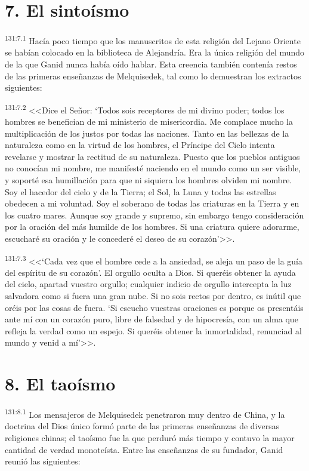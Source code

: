 \section*{7. El sintoísmo}
\par 
\textsuperscript{131:7.1} Hacía poco tiempo que los manuscritos de esta religión del Lejano Oriente se habían colocado en la biblioteca de Alejandría. Era la única religión del mundo de la que Ganid nunca había oído hablar. Esta creencia también contenía restos de las primeras enseñanzas de Melquisedek, tal como lo demuestran los extractos siguientes:

\par 
\textsuperscript{131:7.2} <<Dice el Señor: `Todos sois receptores de mi divino poder; todos los hombres se benefician de mi ministerio de misericordia. Me complace mucho la multiplicación de los justos por todas las naciones. Tanto en las bellezas de la naturaleza como en la virtud de los hombres, el Príncipe del Cielo intenta revelarse y mostrar la rectitud de su naturaleza. Puesto que los pueblos antiguos no conocían mi nombre, me manifesté naciendo en el mundo como un ser visible, y soporté esa humillación para que ni siquiera los hombres olviden mi nombre. Soy el hacedor del cielo y de la Tierra; el Sol, la Luna y todas las estrellas obedecen a mi voluntad. Soy el soberano de todas las criaturas en la Tierra y en los cuatro mares. Aunque soy grande y supremo, sin embargo tengo consideración por la oración del más humilde de los hombres. Si una criatura quiere adorarme, escucharé su oración y le concederé el deseo de su corazón'>>.

\par 
\textsuperscript{131:7.3} <<`Cada vez que el hombre cede a la ansiedad, se aleja un paso de la guía del espíritu de su corazón'. El orgullo oculta a Dios. Si queréis obtener la ayuda del cielo, apartad vuestro orgullo; cualquier indicio de orgullo intercepta la luz salvadora como si fuera una gran nube. Si no sois rectos por dentro, es inútil que oréis por las cosas de fuera. `Si escucho vuestras oraciones es porque os presentáis ante mí con un corazón puro, libre de falsedad y de hipocresía, con un alma que refleja la verdad como un espejo. Si queréis obtener la inmortalidad, renunciad al mundo y venid a mí'>>.

\section*{8. El taoísmo}
\par 
\textsuperscript{131:8.1} Los mensajeros de Melquisedek penetraron muy dentro de China, y la doctrina del Dios único formó parte de las primeras enseñanzas de diversas religiones chinas; el taoísmo fue la que perduró más tiempo y contuvo la mayor cantidad de verdad monoteísta. Entre las enseñanzas de su fundador, Ganid reunió las siguientes:

